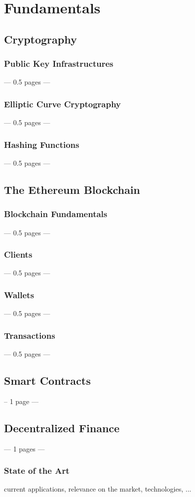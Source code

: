 \chapter{Fundamentals}
\label{cha:Fundamentals}

\section{Cryptography}
\subsection{Public Key Infrastructures}
--- 0.5 pages ---
\subsection{Elliptic Curve Cryptography}
--- 0.5 pages ---
\subsection{Hashing Functions}
--- 0.5 pages ---

\section{The Ethereum Blockchain}
\subsection{Blockchain Fundamentals}
--- 0.5 pages ---
\subsection{Clients}
--- 0.5 pages ---
\subsection{Wallets}
--- 0.5 pages ---
\subsection{Transactions}
--- 0.5 pages ---
\section{Smart Contracts}
-- 1 page ---
\section{Decentralized Finance}
--- 1 pages ---
\subsection{State of the Art}
current applications, relevance on the market, technologies, ...